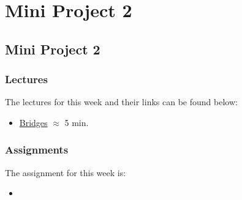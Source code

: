 \clearpage

\renewcommand{\ChapTitle}{Mini Project 2}
\renewcommand{\SectionTitle}{Mini Project 2}

\chapter{\ChapTitle}
\section{\SectionTitle}

\subsection{Lectures}

The lectures for this week and their links can be found below:

\begin{itemize}
    \item \href{https://www.youtube.com/watch?v=nZwSo4vfw6c}{Bridges} $\approx$ 5 min.
\end{itemize}

\subsection{Assignments}

The assignment for this week is:

\begin{itemize}
    \item {}
\end{itemize}